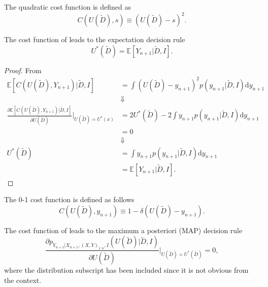 \begin{definition}
	\label{def:quadratic_cost}
	The quadratic cost function is defined as
	\begin{equation}
		C(U(\tilde{D}),s) \equiv (U(\tilde{D})-s)^2.
	\end{equation}
\end{definition}

\begin{theorem}
	\label{theorem:expectation_decision_rule}
	The cost function of  leads to the expectation decision rule
	\begin{equation}
		U^*(\tilde{D}) = \mathbb{E}[Y_{n+1}|\tilde{D},I].
	\end{equation}
\end{theorem}

\begin{proof}
	From 
	\begin{equation}
		\begin{split}
			\mathbb{E}[C(U(\tilde{D}), Y_{n+1})|\tilde{D},I] &= \int (U(\tilde{D})-y_{n+1})^2 p(y_{n+1}|\tilde{D},I) \mathrm{d}y_{n+1}\\
			&\Downarrow\\
			\frac{\partial \mathbb{E}[C(U(\tilde{D}), Y_{n+1})|\tilde{D},I]}{\partial U(\tilde{D})}\bigg|_{U(\tilde{D})=U^*(x)} &= 2U^*(\tilde{D})-2\int y_{n+1}p(y_{n+1}|\tilde{D},I) \mathrm{d}y_{n+1}\\
			&=0\\
			&\Downarrow\\
			U^*(\tilde{D})& = \int y_{n+1}p(y_{n+1}|\tilde{D},I)\mathrm{d}y_{n+1}\\
			&= \mathbb{E}[Y_{n+1}|\tilde{D},I].
		\end{split}
	\end{equation}
\end{proof}

\begin{definition}
	\label{def:0_1_cost_function}
	The 0-1 cost function is defined as follows
	\begin{equation}
		C(U(\tilde{D}),y_{n+1}) \equiv 1-\delta(U(\tilde{D})-y_{n+1}).
	\end{equation}
\end{definition}

\begin{theorem}
	\label{theorem:MAP}
	The cost function of  leads to the maximum a posteriori (MAP) decision rule
	\begin{equation}
		\frac{\partial p_{Y_{n+1}|X_{n+1},(X,Y)_{1\colon n},I}(U(\tilde{D})|\tilde{D},I)}{\partial U(\tilde{D})}\bigg|_{U(\tilde{D})=U^*(\tilde{D})}=0,
	\end{equation}
	where the distribution subscript has been included since it is not obvious from the context.
\end{theorem}

